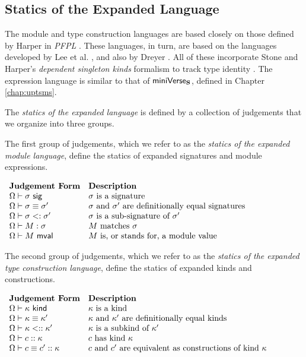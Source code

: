 \subsection{Statics of the Expanded Language}
The module and type construction languages are based closely on those defined by Harper in \emph{PFPL} \cite{pfpl}. These languages, in turn, are based on the languages developed by Lee et al. \cite{conf/popl/LeeCH07}, and also by Dreyer \cite{dreyer2005understanding}. All of these incorporate Stone and Harper's \emph{dependent singleton kinds} formalism to track type identity \cite{stone2006extensional}. The expression language is similar to that of $\mathsf{miniVerse}_\textbf{S}$, defined in Chapter \ref{chap:uptsms}.

The \emph{statics of the expanded language} is defined by a collection of judgements that we organize into three groups. 

The first group of judgements, which we refer to as the \emph{statics of the expanded module language}, define the statics of expanded signatures and module expressions.

\vspace{5px}
$\begin{array}{ll}
\textbf{Judgement Form} & \textbf{Description}\\
\Omega \vdash \sigma~\mathsf{sig} & \text{$\sigma$ is a signature }\\
\Omega \vdash \sigma \equiv \sigma' & \text{$\sigma$ and $\sigma'$ are definitionally equal signatures}\\
\Omega \vdash \sigma <: \sigma' & \text{$\sigma$ is a sub-signature of $\sigma'$}\\
\Omega \vdash M : \sigma & \text{$M$ matches $\sigma$}\\
\Omega \vdash M~\mathsf{mval} & \text{$M$ is, or stands for, a module value}
\end{array}$
\vspace{5px}

The second group of judgements, which we refer to as the \emph{statics of the expanded type construction language}, define the statics of expanded kinds and constructions.

\vspace{5px}
$\begin{array}{ll}
\textbf{Judgement Form} & \textbf{Description}\\
\Omega \vdash \kappa~\mathsf{kind} & \text{$\kappa$ is a kind}\\
\Omega \vdash \kappa \equiv \kappa' & \text{$\kappa$ and $\kappa'$ are definitionally equal kinds}\\
\Omega \vdash \kappa <:: \kappa' & \text{$\kappa$ is a subkind of $\kappa'$}\\
\Omega \vdash c :: \kappa & \text{$c$ has kind $\kappa$}\\
\Omega \vdash c \equiv c' :: \kappa & \text{$c$ and $c'$ are equivalent as constructions of kind $\kappa$}
\end{array}$
\vspace{5px}

